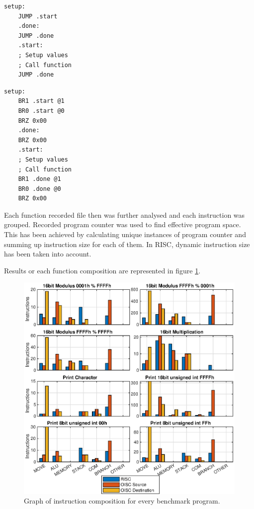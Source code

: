 \begin{blockpage}
	\begin{lstlisting}[frame=single, caption={RISC assembly frame for executring tests}, emph={setup,start,done} label=asmrisctest]
	setup:
	JUMP .start
	.done:
	JUMP .done
	.start:
	; Setup values
	; Call function
	JUMP .done
	\end{lstlisting}
\end{blockpage}

\begin{blockpage}
	\begin{lstlisting}[frame=single, caption={OISC assembly frame for executring tests}, emph={setup,start,done} label=asm_oisc_test]
	setup:
	BR1 .start @1
	BR0 .start @0
	BRZ 0x00
	.done:
	BRZ 0x00
	.start:
	; Setup values
	; Call function
	BR1 .done @1
	BR0 .done @0
	BRZ 0x00
	\end{lstlisting}
\end{blockpage}

Each function recorded file then was further analysed and each instruction was grouped. Recorded program counter was used to find effective program space. This has been achieved by calculating unique instances of program counter and summing up instruction size for each of them. In RISC, dynamic instruction size has been taken into account. 

Results or each function composition are represented in figure \ref{fig:instr_comp}. 
\begin{figure}[t]
	\centering
	\includegraphics[width=\linewidth]{../tests/instr_comp.eps}
	\caption{Graph of instruction composition for every benchmark program.}
	\label{fig:instr_comp}
\end{figure}

